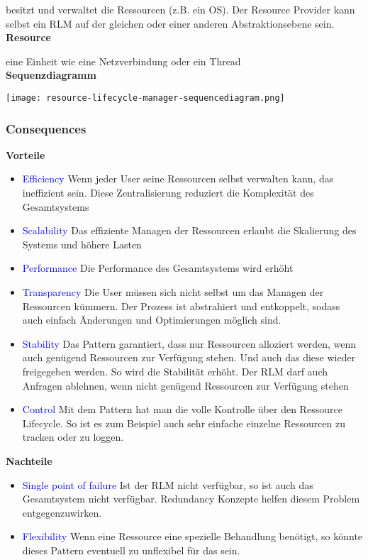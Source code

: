 besitzt und verwaltet die Ressourcen (z.B. ein OS). Der Resource Provider kann selbst ein RLM auf der gleichen oder einer anderen Abstraktionsebene sein. \\

\textbf{Resource}

eine Einheit wie eine Netzverbindung oder ein Thread \\

\textbf{Sequenzdiagramm}

\texttt{[image: resource-lifecycle-manager-sequencediagram.png]}


\subsubsection{Consequences}

\textbf{Vorteile}

\begin{itemize}
    \item \textcolor{blue}{Efficiency} Wenn jeder User seine Ressourcen selbst verwalten kann, das ineffizient sein. Diese Zentralisierung reduziert die Komplexität des Gesamtsystems
    \item \textcolor{blue}{Scalability} Das effiziente Managen der Ressourcen erlaubt die Skalierung des Systems und höhere Lasten
    \item \textcolor{blue}{Performance} Die Performance des Gesamtsystems wird erhöht
    \item \textcolor{blue}{Transparency} Die User müssen sich nicht selbst um das Managen der Ressourcen kümmern. Der Prozess ist abstrahiert und entkoppelt, sodass auch einfach Änderungen und Optimierungen möglich sind.
    \item \textcolor{blue}{Stability} Das Pattern garantiert, dass nur Ressourcen alloziert werden, wenn auch genügend Ressourcen zur Verfügung stehen. Und auch das diese wieder freigegeben werden. So wird die Stabilität erhöht. Der RLM darf auch Anfragen ablehnen, wenn nicht genügend Ressourcen zur Verfügung stehen
    \item \textcolor{blue}{Control} Mit dem Pattern hat man die volle Kontrolle über den Ressource Lifecycle. So ist es zum Beispiel auch sehr einfache einzelne Ressourcen zu tracken oder zu loggen.
\end{itemize}
\vspace{10pt}
\textbf{Nachteile}

\begin{itemize}
    \item \textcolor{blue}{Single point of failure} Ist der RLM nicht verfügbar, so ist auch das Gesamtsystem nicht verfügbar. Redundancy Konzepte helfen diesem Problem entgegenzuwirken.
    \item \textcolor{blue}{Flexibility} Wenn eine Ressource eine spezielle Behandlung benötigt, so könnte dieses Pattern eventuell zu unflexibel für das sein.
\end{itemize}


